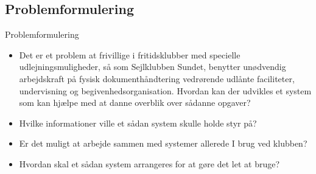 \subsection{Problemformulering}

\begin{frame}{Problemformulering}
  \begin{itemize}
    \item Det er et problem at frivillige i fritidsklubber med specielle udlejningsmuligheder, så som Sejlklubben Sundet, benytter unødvendig arbejdskraft på fysisk dokumenthåndtering vedrørende udlånte faciliteter, undervisning og begivenhedsorganisation. Hvordan kan der udvikles et system som kan hjælpe med at danne overblik over sådanne opgaver?
    \item Hvilke informationer ville et sådan system skulle holde styr på?
    \item Er det muligt at arbejde sammen med systemer allerede I brug ved klubben?
    \item Hvordan skal et sådan system arrangeres for at gøre det let at bruge?
  \end{itemize}
\end{frame}
